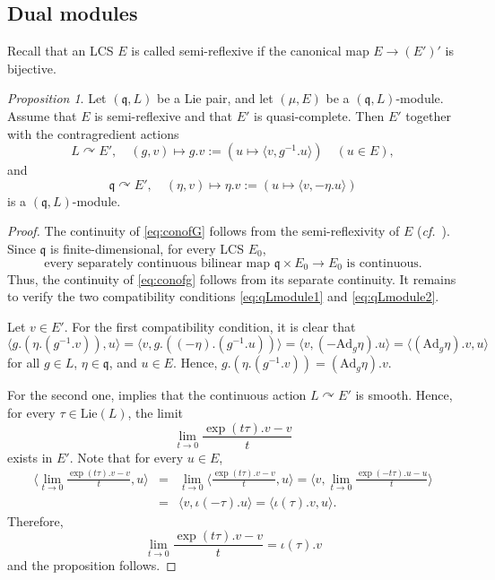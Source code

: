 \documentclass[12pt, a4paper]{amsart}
\newcommand{\Ad}{{\mathrm{Ad}}}
\newcommand{\Lie}{{\mathrm{Lie}}}
\newcommand{\q}{\mathfrak q}
\newcommand{\la}{\langle}
\newcommand{\ra}{\rangle}
\newcommand{\be}{\begin {equation}}
\newcommand{\ee}{\end {equation}}
\newcommand{\cf}{\textit{cf.}~}
\theoremstyle{Theorem}
\theoremstyle{Theorem}
\theoremstyle{Theorem}
\theoremstyle{Theorem}
\theoremstyle{Plain}
\theoremstyle{remark}
\theoremstyle{remark}
\theoremstyle{Definition}
\newtheorem{prpd}[dfn]{Proposition}
\numberwithin{equation}{section}
\begin{document}
\subsection{Dual modules}\label{sec:dualrep} 
Recall that an LCS $E$ is called semi-reflexive if the canonical map $E\rightarrow (E')'$ is bijective.  %
\begin{prpd}\label{prop:contraofgG}
   Let $(\q,L)$ be a Lie pair, and let $(\mu,E)$ be a $(\q,L)$-module.
Assume that $E$ is semi-reflexive and that $E'$ is quasi-complete. Then $E'$ together with the contragredient actions 
\be\label{eq:conofG} L \curvearrowright E', \quad (g,v)\mapsto g.v:=(u\mapsto \la v,g^{-1}.u\ra)\quad (u\in E),
\ee and 
\be\label{eq:conofg}  \q \curvearrowright E', \quad (\eta,v)\mapsto \eta.v:=(u\mapsto \la v,-\eta.u\ra)\ee
is a $(\q, L)$-module.
\end{prpd}
\begin{proof}
     The continuity of \eqref{eq:conofG} follows from the semi-reflexivity of $E$ (\cf \cite[Corollary 4.1.2.3]{Ga}). Since $\q$ is finite-dimensional, for every LCS $E_0$,
\be\label{eq:algconti}
\text{every separately continuous bilinear map $\q\times E_0\rightarrow E_0$ is continuous.}
\ee
Thus, the continuity of \eqref{eq:conofg} follows from its separate continuity. It remains to verify the two compatibility conditions
\eqref{eq:qLmodule1} and \eqref{eq:qLmodule2}.

Let $v\in E'$. For the first compatibility condition, it is clear  that \[ \la  g.(\eta.(g^{-1}.v)),u\ra =\la v, g.((-\eta).(g^{-1}.u))\ra =\la v, (-\Ad_g\eta).u\ra= \la(\Ad_g\eta).v,u\ra\] for all $g\in L$, $\eta\in\q$, and $u\in E$. 
Hence, 
$
g.(\eta.(g^{-1}.v))=(\Ad_g\eta).v$.

For the second one, \cite[Theorem 4.5]{Ca} implies that the continuous action
$L\curvearrowright E'$ is smooth.  Hence, for every $\tau\in\Lie(L)$, the limit
\[
\lim_{t\to 0}\frac{\exp(t\tau).v-v}{t}
\]
exists in $E'$. Note that for every $u\in E$, \begin{eqnarray*} \la\lim_{t\rightarrow 0}\frac{\exp(t\tau).v-v}{t},u\ra&=&\lim_{t\rightarrow 0}\la \frac{\exp(t\tau).v-v}{t},u \ra=\la v,\lim_{t\rightarrow 0}\frac{\exp(-t\tau).u-u}{t} \ra\\ &=&\la v,\iota(-\tau).u\ra=\la\iota(\tau).v,u\ra. \end{eqnarray*} Therefore, \[\lim_{t\to 0}\frac{\exp(t\tau).v-v}{t}=\iota(\tau).v\] and the proposition follows. \end{proof}
\end{document}
